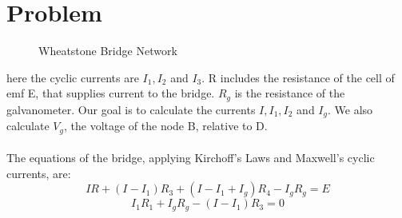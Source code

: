 \documentclass{article}
\begin{document}
\section{Problem}
\begin{figure}[H]
\centering 
\noindent{}%
\caption{Wheatstone Bridge Network}
\end{figure}
here the cyclic currents are $I_1, I_2$ and $I_3$. R includes the resistance of the cell of emf E, that supplies current to the bridge. $R_g$ is the resistance of the galvanometer. Our goal is to calculate the currents $I, I_1, I_2$ and $I_g$. We also calculate $V_g$, the voltage of the node B, relative to D. \\
\\
The equations of the bridge, applying Kirchoff's Laws and Maxwell's cyclic currents, are:
\begin{equation}
IR+(I-I_1)R_3+(I-I_1+I_g)R_4-I_gR_g=E 
\end{equation}
\begin{equation}
I_1R_1+I_gR_g-(I-I_1)R_3=0 
\end{equation}
\end{document}
